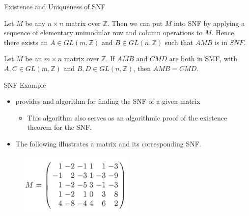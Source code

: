 \documentclass{beamer}
\begin{document}
\begin{frame}{Existence and Uniqueness of SNF}
    \begin{Theorem}
        Let $M$ be any $n \times n$ matrix over $\mathbb{Z}$. Then we can put $M$ into SNF by applying a sequence of elementary unimodular row and column operations to $M$. Hence, there exists an $A \in GL(m, \mathbb{Z})$ and $B \in GL(n, \mathbb{Z})$ such that $AMB$ is in $SNF$.
    \end{Theorem}
    \begin{theorem}
        Let $M$ be an $m \times n$ matrix over $\mathbb{Z}$. If $AMB$ and $CMD$ are both in SMF, with $A, C \in GL(m, \mathbb{Z})$ and $B, D \in GL(n, \mathbb{Z})$, then $AMB = CMD$.
    \end{theorem}
\end{frame}
\begin{frame}{SNF Example}
    \begin{itemize}
        \item \cite{holt2005handbook} provides and algorithm for finding the SNF of a given matrix
        \begin{itemize}
            \item This algorithm also serves as an algorithmic proof of the existence theorem for the SNF.
        \end{itemize}
        \item The following illustrates a matrix and its corresponding SNF.
    \end{itemize}
    \begin{figure}
        \centering
        \includegraphics[width=0.5\textwidth]{SNFExample.png}
    \end{figure}
\end{frame}
\end{document}
